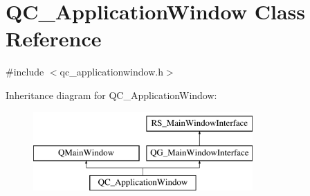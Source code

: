 \hypertarget{classQC__ApplicationWindow}{\section{Q\-C\-\_\-\-Application\-Window Class Reference}
\label{classQC__ApplicationWindow}
}


{\ttfamily \#include $<$qc\-\_\-applicationwindow.\-h$>$}

Inheritance diagram for Q\-C\-\_\-\-Application\-Window\-:\begin{figure}[H]
\begin{center}
\leavevmode
\includegraphics[height=3.000000cm]{classQC__ApplicationWindow}
\end{center}
\end{figure}
